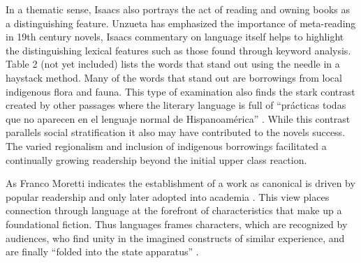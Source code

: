 \documentclass[12pt]{report}
\begin{document}
In a thematic sense, Isaacs also portrays the act of reading and owning books as a distinguishing feature. 
Unzueta has emphasized the importance of meta-reading in 19th century novels, Isaacs commentary on language itself helps to highlight the distinguishing lexical features such as those found through keyword analysis.
Table 2 (not yet included) lists the words that stand out using the needle in a haystack method.
Many of the words that stand out are borrowings from local indigenous flora and fauna.
This type of examination also finds the stark contrast created by other passages where the literary language is full of \enquote{prácticas todas que no aparecen en el lenguaje normal de Hispanoamérica} \autocite[42]{McGrady2012}.
While this contrast parallels social stratification it also may have contributed to the novels success.
The varied regionalism and inclusion of indigenous borrowings facilitated a continually growing readership beyond the initial upper class reaction.

As Franco Moretti indicates the establishment of a work as canonical is driven by popular readership and only later adopted into academia \autocite[]{Moretti2013}.
This view places connection through language at the forefront of characteristics that make up a foundational fiction. 
Thus languages frames characters, which are recognized by audiences, who find unity in the imagined constructs of similar experience, and are finally \enquote{folded into the state apparatus} \autocite[27]{Felski2008}.
\end{document}
